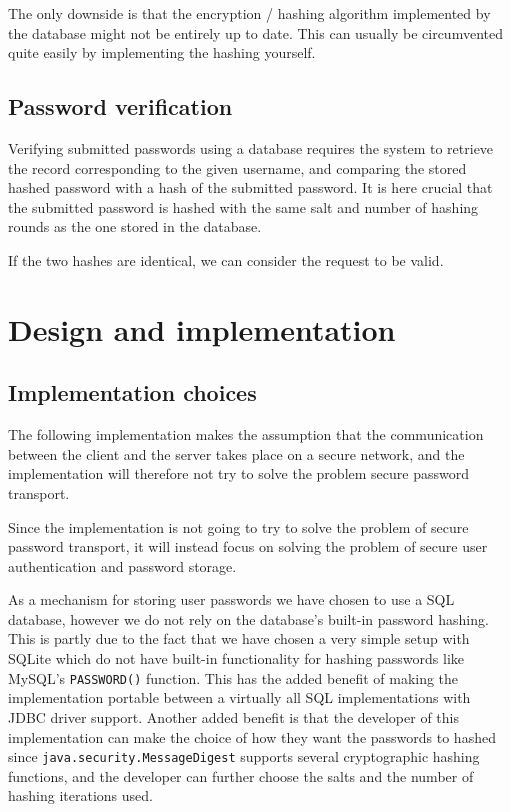 \documentclass[12pt]{article}
\begin{document}
The only downside is that the encryption / hashing algorithm implemented by the database might not be entirely up to date. This can usually be circumvented quite easily by implementing the hashing yourself.

\subsection{Password verification}
\label{sub:Password verification}

Verifying submitted passwords using a database requires the system to retrieve the record corresponding to the given username, and comparing the stored hashed password with a hash of the submitted password. It is here crucial that the submitted password is hashed with the same salt and number of hashing rounds as the one stored in the database.

If the two hashes are identical, we can consider the request to be valid.

\section{Design and implementation}
\label{sec:Design and implementation}

\subsection{Implementation choices}
\label{sub:Implementation choicesn}


The following implementation makes the assumption that the communication between the client and the server takes place on a secure network, and the implementation will therefore not try to solve the problem secure password transport.

Since the implementation is not going to try to solve the problem of secure password transport, it will instead focus on solving the problem of secure user authentication and password storage.

As a mechanism for storing user passwords we have chosen to use a SQL database, however we do not rely on the database's built-in password hashing. This is partly due to the fact that we have chosen a very simple setup with SQLite which do not have built-in functionality for hashing passwords like MySQL's \texttt{PASSWORD()} function. This has the added benefit of making the implementation portable between a virtually all SQL implementations with JDBC driver support. Another added benefit is that the developer of this implementation can make the choice of how they want the passwords to hashed since \texttt{java.security.MessageDigest} supports several cryptographic hashing functions, and the developer can further choose the salts and the number of hashing iterations used.
\end{document}
